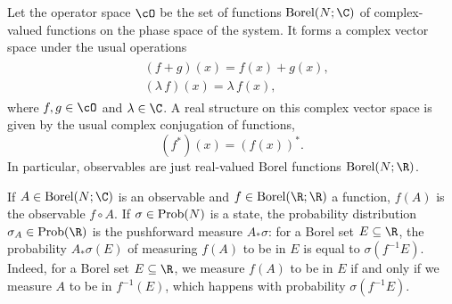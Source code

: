 Let the operator space $\cO$ be the set of functions $\textnormal{Borel}(N; \C)$ of complex-valued functions on the phase space of the system. It forms a complex vector space under the usual operations
\begin{align*} \begin{split}
    & (f + g)(x) = f(x) + g(x),\\
    & (\lambda \, f)(x) = \lambda \, f(x),
\end{split} \end{align*}
where $f, g \in \cO$ and $\lambda \in \C$. A real structure on this complex vector space is given by the usual complex conjugation of functions,
\begin{equation*}
    (f^*)(x) = (f(x))^*.
\end{equation*}
In particular, observables are just real-valued Borel functions $\textnormal{Borel}(N; \R)$.

If $A \in \textnormal{Borel}(N; \C)$ is an observable and $f \in \textnormal{Borel}(\R; \R)$ a function, $f(A)$ is the observable $f \circ A$. If $\sigma \in \textnormal{Prob}(N)$ is a state, the probability distribution $\sigma_A \in \textnormal{Prob}(\R)$ is the pushforward measure $A_* \sigma$: for a Borel set $E \subseteq \R$, the probability $A_* \sigma(E)$ of measuring $f(A)$ to be in $E$ is equal to $\sigma(f^{-1} E)$. Indeed, for a Borel set $E \subseteq \R$, we measure $f(A)$ to be in $E$ if and only if we measure $A$ to be in $f^{-1}(E)$, which happens with probability $\sigma(f^{-1} E)$.

